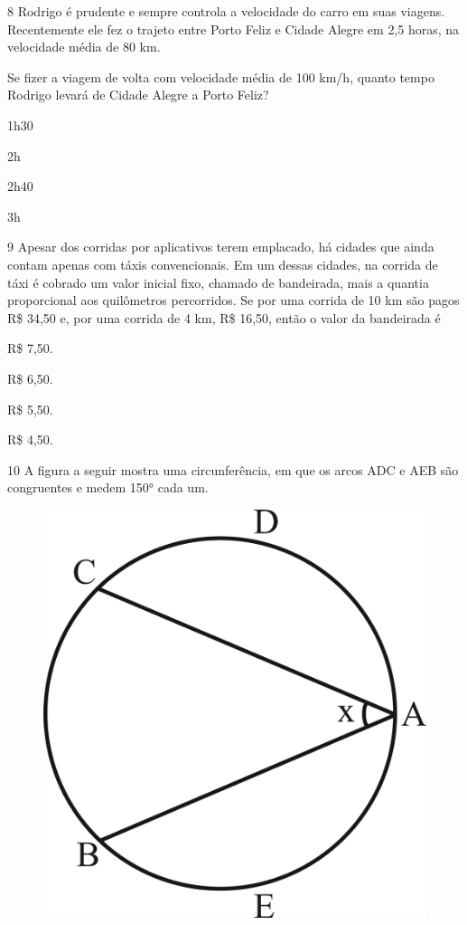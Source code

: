 \num{8} Rodrigo é prudente e sempre controla a velocidade do carro em suas
viagens. Recentemente ele fez o trajeto entre Porto Feliz e Cidade Alegre em 
2,5 horas, na  velocidade média de 80 km.

Se fizer a viagem de volta com velocidade média de 100 km/h, quanto tempo 
Rodrigo levará de Cidade Alegre a Porto Feliz?  

\begin{multicols}{2}
\begin{escolha}

  \item 1h30

  \item 2h 
  
  \item 2h40
  
  \item 3h

\end{escolha}
\end{multicols}


\num{9} Apesar dos corridas por aplicativos terem emplacado, há cidades que ainda
contam apenas com táxis convencionais. Em um dessas cidades, na corrida de 
táxi é cobrado um valor inicial fixo, chamado de bandeirada, mais a quantia
proporcional aos quilômetros percorridos. Se por uma corrida de 10 km são pagos
R\$ 34,50 e, por uma corrida de 4 km, R\$ 16,50, então o valor da bandeirada é

\begin{multicols}{2}
\begin{escolha}

  \item R\$ 7,50.

  \item R\$ 6,50.

  \item R\$ 5,50.

  \item R\$ 4,50.
\end{escolha}
\end{multicols}

\pagebreak
\num{10} A figura a seguir mostra uma circunferência, em que os arcos ADC e
AEB são congruentes e medem 150° cada um.

\begin{figure}[htpb!]
\centering
\includegraphics[width=.4\textwidth]{./ilustras-mat/Simulado_1-atividade_10.png}
\end{figure}


